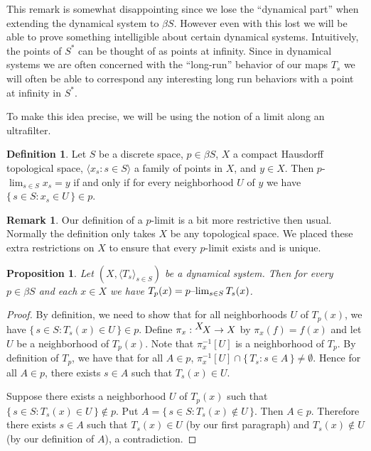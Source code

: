 \documentclass[12pt]{article}
\theoremstyle{plain}
\newtheorem{prop}[thm]{Proposition}
\theoremstyle{definition}
\newtheorem{defn}[thm]{Definition}
\newtheorem{rmk}[thm]{Remark}
\newcommand{\la}{\langle}
\newcommand{\ra}{\rangle}
\newcommand{\ds}{(X, \la T_s \ra_{s\in S})}
\newcommand{\setfunc}[2]{\hbox{${}^{\hbox{$#1$}}\hskip -2 pt #2$}}
\begin{document}
This remark is somewhat disappointing since we lose the ``dynamical
part'' when extending the dynamical system to $\beta S$.
However even with this lost we will be able to prove something
intelligible about certain dynamical systems. 
Intuitively, the points of $S^*$ can be thought of as points at
infinity. 
Since in dynamical systems we are often concerned with the
``long-run'' behavior of our maps $T_s$ we will often be able to
correspond any interesting long run behaviors with a point at infinity
in $S^*$.

To make this idea precise, we will be using the notion of a limit
along an ultrafilter. 

  \begin{defn}
    \label{defn:plim}
    Let $S$ be a discrete space, $p \in \beta S$, $X$ a compact
    Hausdorff topological space, $\la x_s : s \in S \ra$ a family
    of points in $X$, and $y \in X$.
    Then \hbox{$p$-$\displaystyle\lim_{s \in S} x_s = y$} if and only
    if for every
    neighborhood $U$ of $y$ we have $\{\, s \in S : x_s \in U \,\} \in p$.
  \end{defn}
\begin{rmk}
    Our definition of a \hbox{$p$-limit} is a bit more restrictive
    then usual.
    Normally the definition only takes $X$ be any topological space.
    We placed these extra restrictions on $X$ to ensure that every
    \hbox{$p$-limit} exists and is unique.
  \end{rmk}
\begin{prop}
    \label{prop:dsplim}
    Let $\ds$ be a dynamical system.
    Then for every $p \in \beta S$ and each $x \in X$ we have $T_p(x)
    = \hbox{$p$--$\lim_{s \in S} T_s(x)$}$.
  \end{prop}
  \begin{proof}
    By definition, we need to show that for all neighborhoods $U$ of
    $T_p(x)$, we have $\{\, s \in S : T_s(x) \in U \,\} \in p$. 
    Define $\pi_x : \setfunc{X}{X} \to X$ by $\pi_x(f) = f(x)$ and let
    $U$ be a neighborhood of $T_p(x)$.
    Note that $\pi_x^{-1}[U]$ is a neighborhood of $T_p$.
    By definition of $T_p$, we have that for all $A \in p$,
    $\pi_x^{-1}[U] \cap \{\, T_s : s \in A \,\} \ne \emptyset$. 
    Hence for all $A \in p$, there exists $s \in A$ such that $T_s(x)
    \in U$. 

    Suppose there exists a neighborhood $U$ of $T_p(x)$ such that
    $\{\, s \in S : T_s(x) \in U \,\} \not\in p$. 
    Put $A = \{\, s \in S : T_s(x) \not\in U\,\}$.
    Then $A \in p$.
    Therefore there exists $s \in A$ such that $T_s(x) \in U$ (by our
    first paragraph) and $T_s(x) \not\in U$ (by our definition of
    $A$), a contradiction.
  \end{proof}
\end{document}
